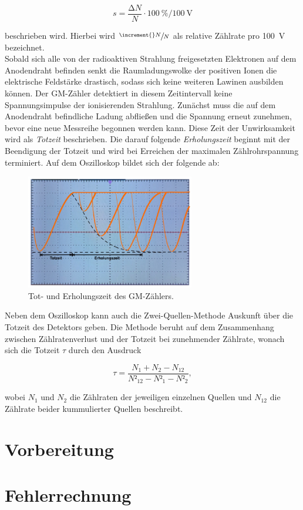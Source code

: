 \begin{equation}
\label{eqn:mPlateau}
    s = \frac{\increment{}N}{N}\cdot{}\qty{100}{\percent} / \qty{100}{\volt}
\end{equation}

\noindent beschrieben wird. Hierbei wird $\sfrac{\increment{}N}{N}$ als relative Zählrate pro \qty{100}{\volt} bezeichnet.\\

\noindent Sobald sich alle von der radioaktiven Strahlung freigesetzten Elektronen auf dem Anodendraht befinden senkt die 
Raumladungswolke der positiven Ionen die elektrische Feldstärke drastisch, sodass sich keine weiteren Lawinen ausbilden können.
Der GM-Zähler detektiert in diesem Zeitintervall keine Spannungsimpulse der ionisierenden Strahlung. Zunächst muss die auf dem 
Anodendraht befindliche Ladung abfließen und die Spannung erneut zunehmen, bevor eine neue Messreihe begonnen werden kann. Diese 
Zeit der Unwirksamkeit wird als \emph{Totzeit} beschrieben. Die darauf folgende \emph{Erholungszeit} beginnt mit der 
Beendigung der Totzeit und wird bei Erreichen der maximalen Zählrohrspannung terminiert. Auf dem Oszilloskop bildet sich der 
folgende ab:

\begin{figure}[H]
    \centering
    \includegraphics[height=5cm]{Totzeit.png}
    \caption{Tot- und Erholungszeit des GM-Zählers\cite{Versuchsanleitung_v703}.}
    \label{fig:Totzeit}
\end{figure}

\noindent Neben dem Oszilloskop kann auch die Zwei-Quellen-Methode Auskunft über die Totzeit des Detektors geben.
Die Methode beruht auf dem Zusammenhang zwischen Zählratenverlust und der Totzeit bei zunehmender Zählrate, wonach 
sich die Totzeit $\tau$ durch den Ausdruck 

\begin{equation}
\label{eqn:Totzeit}
    \tau = \frac{N_1 + N_2 - N_{12}}{N²_{12} - N²_1 - N²_2},
\end{equation}

\noindent wobei $N_1$ und $N_2$ die Zählraten der jeweiligen einzelnen Quellen und $N_{12}$ die Zählrate beider kummulierter Quellen 
beschreibt.

  
\section{Vorbereitung}


\section{Fehlerrechnung}
